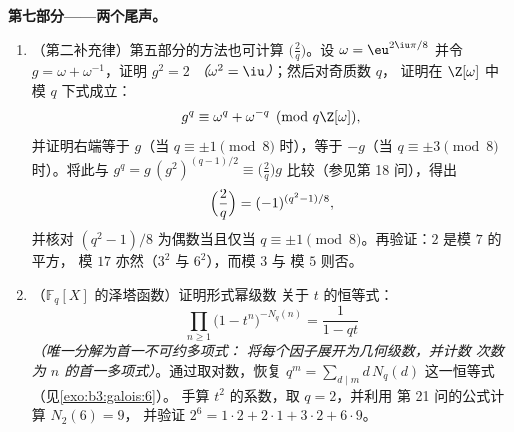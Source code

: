 \begin{problem}
\medskip
\noindent\textbf{第七部分——两个尾声。}
\begin{enumerate}[resume]
  \item （第二补充律）第五部分的方法也可计算
        $\bigl(\frac2q\bigr)$。设 $\omega = \eu^{2\iu\pi/8}$
        并令 $g = \omega + \omega^{-1}$，证明 $g^2 = 2$
        \emph{（$\omega^2 = \iu$）}；然后对奇质数 $q$，
        证明在 $\Z[\omega]$ 中模 $q$ 下式成立：
        \[
        g^q \equiv \omega^q + \omega^{-q} \pmod{q\Z[\omega]},
        \]
        并证明右端等于 $g$（当 $q \equiv \pm1
        \pmod 8$ 时），等于 $-g$（当 $q \equiv \pm3 \pmod 8$ 时）。将此与
        $g^q = g\,(g^2)^{(q-1)/2} \equiv
        \bigl(\frac2q\bigr)g$ 比较（参见第 18 问），得出
        \[
        \Bigl(\frac2q\Bigr) = (-1)^{(q^2-1)/8},
        \]
        并核对 $(q^2 - 1)/8$ 为偶数当且仅当 $q
        \equiv \pm1 \pmod 8$。再验证：$2$ 是模 $7$ 的平方，
        模 $17$ 亦然（$3^2$ 与 $6^2$），而模 $3$ 与
        模 $5$ 则否。
  \item （$\mathbb F_q[X]$ 的泽塔函数）证明形式幂级数
        关于 $t$ 的恒等式：
        \[
        \prod_{n \geq 1}\bigl(1 - t^n\bigr)^{-N_q(n)}
        = \frac1{1 - qt}
        \]
        \emph{（唯一分解为首一不可约多项式：
        将每个因子展开为几何级数，并计数
        次数为 $n$ 的首一多项式）}。通过取对数，恢复
        $q^m = \sum_{d \mid m}d\,N_q(d)$ 这一恒等式
        （见\cref{exo:b3:galois:6}）。
        手算 $t^2$ 的系数，取 $q = 2$，并利用
        第 21 问的公式计算 $N_2(6) = 9$，
        并验证 $2^6 = 1\cdot2 + 2\cdot1 + 3\cdot2 +
        6\cdot9$。
\end{enumerate}
\end{problem}
